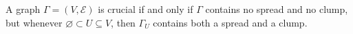 A graph $\Gamma = (V, \mathcal{E})$ is crucial if and only if $\Gamma$ contains no spread and no clump, but whenever $\varnothing \subset U \subseteq V$, then $\Gamma_U$ contains both a spread and a clump.
